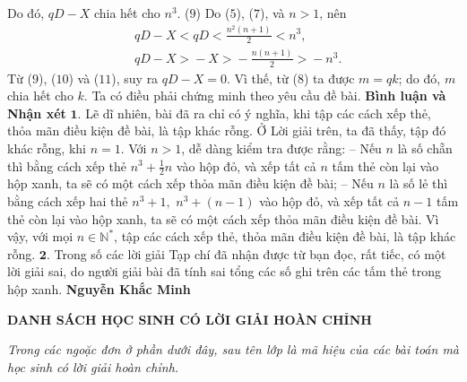 \begin{multicols}{2}
	Do đó, $qD - X$ chia hết cho $n^3$. \hfill ($9$)
	\vskip 0.05cm
	Do ($5$), ($7$), và $n > 1$, nên
	\begin{align*}
		&qD \!-\! X \!<\! qD \!<\! \frac{{{n^2}\left( {n + 1} \right)}}{2} < {n^3}, \tag{$10$}\\
		&qD \!-\! X \!>\! -\! X \!>\! -\! \frac{{n\left( {n \!+\! 1} \right)}}{2} \!>\!  - {n^3}. \tag{$11$}
	\end{align*}
	Từ ($9$), ($10$) và ($11$), suy ra $qD - X = 0$. Vì thế, từ ($8$) ta được $m = qk$; do đó, $m$ chia hết cho $k$. Ta có điều phải chứng minh theo yêu cầu đề bài.
	\vskip 0.05cm
	\textbf{\color{thachthuctoanhoc}Bình luận và Nhận xét}
	\vskip 0.05cm
	$\pmb{1.}$ Lẽ dĩ nhiên, bài đã ra chỉ có ý nghĩa, khi tập các cách xếp thẻ, thỏa mãn điều kiện đề bài, là tập khác rỗng.
	\vskip 0.05cm
	Ở Lời giải trên, ta đã thấy, tập đó khác rỗng, khi $n = 1$.
	\vskip 0.05cm
	Với $n > 1$, dễ dàng kiểm tra được rằng:
	\vskip 0.05cm
	-- Nếu $n$ là số chẵn thì bằng cách xếp thẻ  ${n^3} + \frac{1}{2}n$ vào hộp đỏ, và xếp tất cả $n$ tấm thẻ còn lại vào hộp xanh, ta sẽ có một cách xếp thỏa mãn điều kiện đề bài;
	\vskip 0.05cm
	-- Nếu $n$ là số lẻ thì bằng cách xếp hai thẻ ${n^3} + 1,$ ${n^3} + \left( {n - 1} \right)$   vào hộp đỏ, và xếp tất cả $n - 1$ tấm thẻ còn lại vào hộp xanh, ta sẽ có một cách xếp thỏa mãn điều kiện đề bài.
	\vskip 0.05cm
	Vì vậy, với mọi $n \in \mathbb{N^*}$, tập các cách xếp thẻ, thỏa mãn điều kiện đề bài, là tập khác rỗng.
	\vskip 0.05cm
	$\pmb{2.}$ Trong số các lời giải Tạp chí đã nhận được từ bạn đọc, rất tiếc, có một lời giải sai, do người giải bài đã tính sai tổng các số ghi trên các tấm thẻ trong hộp xanh.
	\vskip 0.1cm
	\hfill\textbf{\color{thachthuctoanhoc}Nguyễn Khắc Minh}
\end{multicols}
\centerline{\textbf{\color{thachthuctoanhoc}DANH SÁCH HỌC SINH CÓ LỜI GIẢI HOÀN CHỈNH}}
\vskip 0.1cm
\textit{Trong các ngoặc đơn ở phần dưới đây, sau tên lớp là mã hiệu của các bài toán mà học sinh có lời giải hoàn chỉnh.}
